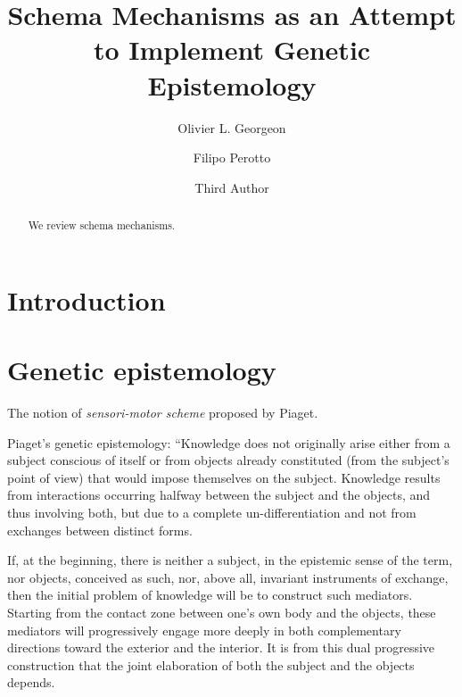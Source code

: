 \documentclass[runningheads]{llncs}
\begin{document}
%
\title{Schema Mechanisms as an Attempt to Implement Genetic Epistemology}
%
%
\author{Olivier L. Georgeon \and
Filipo Perotto \and
Third Author}
%
%
%
\maketitle              %
%
\begin{abstract}
We review schema mechanisms.

\end{abstract}
%
%
%
\section{Introduction}

\section{Genetic epistemology}

The notion of \textit{sensori-motor scheme} proposed by Piaget. 

Piaget's genetic epistemology: 
``Knowledge does not originally arise either from a subject conscious of itself or from objects already constituted (from the subject's point of view) that would impose themselves on the subject. 
Knowledge results from interactions occurring halfway between the subject and the objects, and thus involving both, but due to a complete un-differentiation and not from exchanges between distinct forms.

If, at the beginning, there is neither a subject, in the epistemic sense of the term, nor objects, conceived as such, nor, above all, invariant instruments of exchange, then the initial problem of knowledge will be to construct such mediators. 
Starting from the contact zone between one's own body and the objects, these mediators will progressively engage more deeply in both complementary directions toward the exterior and the interior. 
It is from this dual progressive construction that the joint elaboration of both the subject and the objects depends.
\end{document}
